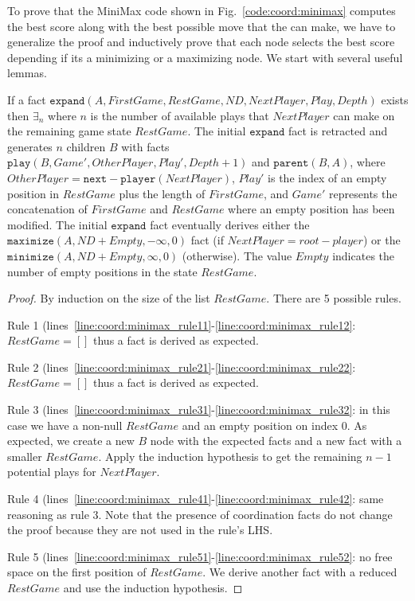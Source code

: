 To prove that the MiniMax code shown in Fig.~\ref{code:coord:minimax} computes
the best score along with the best possible move that the  can
make, we have to generalize the proof and inductively prove that each node
selects the best score depending if its a minimizing or a maximizing node. We
start with several useful lemmas.

\begin{lemma}

If a fact $\mathtt{expand}(A, FirstGame, RestGame, ND,
NextPlayer, Play, Depth)$ exists then $\exists_n$ where $n$ is the number of
available plays that $NextPlayer$ can make on the remaining game state
$RestGame$. The initial $\mathtt{expand}$ fact is retracted and generates $n$
children $B$ with facts $\mathtt{play}(B, Game', OtherPlayer, Play', Depth + 1)$
and $\mathtt{parent}(B, A)$, where $OtherPlayer =
\mathtt{next-player}(NextPlayer)$, $Play'$ is the index of an empty position in
$RestGame$ plus the length of $FirstGame$, and $Game'$ represents the
concatenation of $FirstGame$ and $RestGame$ where an empty position has been
modified. The initial $\mathtt{expand}$ fact eventually derives either the
$\mathtt{maximize}(A, ND + Empty, -\infty, 0)$ fact (if
$NextPlayer = root-player$) or the $\mathtt{minimize}(A, ND +
Empty, \infty, 0)$ (otherwise).  The value $Empty$ indicates the number of empty
positions in the state $RestGame$.

\end{lemma}

\begin{proof}
By induction on the size of the list $RestGame$. There are 5 possible rules.

Rule 1 (lines~\ref{line:coord:minimax_rule11}-\ref{line:coord:minimax_rule12}:
$RestGame = []$ thus a  fact is derived as expected.

Rule 2 (lines~\ref{line:coord:minimax_rule21}-\ref{line:coord:minimax_rule22}:
$RestGame = []$ thus a  fact is derived as expected.

Rule 3 (lines~\ref{line:coord:minimax_rule31}-\ref{line:coord:minimax_rule32}:
in this case we have a non-null $RestGame$ and an empty position on index 0. As
expected, we create a new $B$ node with the expected facts and a new 
fact with a smaller $RestGame$. Apply the induction hypothesis to get the
remaining $n-1$ potential plays for $NextPlayer$.

Rule 4 (lines~\ref{line:coord:minimax_rule41}-\ref{line:coord:minimax_rule42}:
same reasoning as rule 3. Note that the presence of coordination facts do not
change the proof because they are not used in the rule's LHS.

Rule 5 (lines~\ref{line:coord:minimax_rule51}-\ref{line:coord:minimax_rule52}:
no free space on the first position of $RestGame$. We derive another
 fact with a reduced $RestGame$ and use the induction
hypothesis.

\end{proof}

